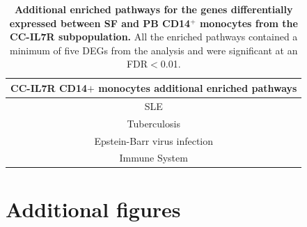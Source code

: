 \begin{table}[htbp]
\centering
\begin{tabular}{@{} c }
\toprule
\textbf{CC-IL7R CD14$+$ monocytes additional enriched pathways} \\
\midrule
\midrule
SLE \\
Tuberculosis \\
Epstein-Barr virus infection \\
Immune System \\
\bottomrule
\end{tabular}
\medskip %
\caption[Additional enriched pathways for the genes differentially expressed between SF and PB CD14$^+$ monocytes from the CC-mixed subpopulation.]{\textbf{Additional enriched pathways for the genes differentially expressed between SF and PB CD14$^+$ monocytes from the CC-IL7R subpopulation.} All the enriched pathways contained a minimum of five DEGs from the analysis and were significant at an FDR$<$0.01.}
\label{tab:PSA_scRNAseq_CC_IL7R_additional_pathways}
\end{table}

%

\section{Additional figures}
